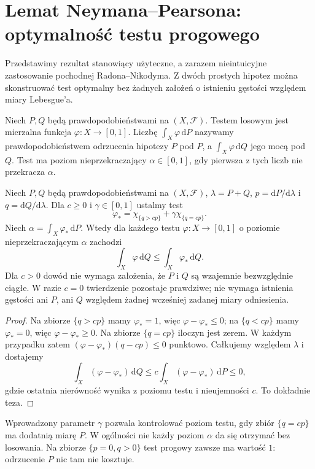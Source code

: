 \section{Lemat Neymana--Pearsona: optymalność testu progowego}
Przedstawimy rezultat stanowiący użyteczne, a zarazem nieintuicyjne
zastosowanie pochodnej Radona--Nikodyma. Z dwóch prostych hipotez
można skonstruować test optymalny bez żadnych założeń o istnieniu
gęstości względem miary Lebesgue'a.

\begin{definicja}
\label{def:test-19}
Niech $P,Q$ będą prawdopodobieństwami na $(X,\mathcal F)$.
Testem losowym jest mierzalna funkcja $\varphi:X\to[0,1]$.
Liczbę $\int_X\varphi\,\mathrm dP$ nazywamy
prawdopodobieństwem odrzucenia hipotezy $P$ pod $P$,
a $\int_X\varphi\,\mathrm dQ$ jego mocą pod $Q$.
Test ma poziom nieprzekraczający $\alpha\in[0,1]$,
gdy pierwsza z tych liczb nie przekracza $\alpha$.
\end{definicja}

\begin{twierdzenie}
\label{thm:neyman-pearson-19}
Niech $P,Q$ będą prawdopodobieństwami na $(X,\mathcal F)$,
$\lambda=P+Q$, $p=\mathrm dP/\mathrm d\lambda$
i $q=\mathrm dQ/\mathrm d\lambda$.
Dla $c\ge0$ i $\gamma\in[0,1]$ ustalmy test
\[
\varphi_*=\chi_{\{q>cp\}}+
 \gamma\chi_{\{q=cp\}}.
\]
Niech $\alpha=\int_X\varphi_*\,\mathrm dP$.
Wtedy dla każdego testu $\varphi:X\to[0,1]$ o poziomie
nieprzekraczającym $\alpha$ zachodzi
\[
 \int_X\varphi\,\mathrm dQ\le
 \int_X\varphi_*\,\mathrm dQ.
\]
Dla $c>0$ dowód nie wymaga założenia, że
$P$ i $Q$ są wzajemnie bezwzględnie ciągłe.
W razie $c=0$ twierdzenie pozostaje prawdziwe;
nie wymaga istnienia gęstości ani $P$, ani $Q$ względem
żadnej wcześniej zadanej miary odniesienia.
\end{twierdzenie}
\begin{proof}
Na zbiorze $\{q>cp\}$ mamy $\varphi_*=1$, więc
$\varphi-\varphi_*\le0$; na $\{q<cp\}$ mamy
$\varphi_*=0$, więc $\varphi-\varphi_*\ge0$.
Na zbiorze $\{q=cp\}$ iloczyn jest zerem. W każdym
przypadku zatem
$(\varphi-\varphi_*)(q-cp)\le0$ punktowo.
Całkujemy względem $\lambda$ i dostajemy
\[
\int_X(\varphi-\varphi_*)\,\mathrm dQ
\le c\int_X(\varphi-\varphi_*)\,\mathrm dP\le0,
\]
gdzie ostatnia nierówność wynika z poziomu testu
i nieujemności $c$. To dokładnie teza.
\end{proof}

\begin{uwaga}
Wprowadzony parametr $\gamma$ pozwala kontrolować poziom
testu, gdy zbiór $\{q=cp\}$ ma dodatnią miarę $P$.
W ogólności nie każdy poziom $\alpha$ da się otrzymać
bez losowania. Na zbiorze $\{p=0,q>0\}$ test progowy
zawsze ma wartość $1$: odrzucenie $P$ nic tam nie kosztuje.
\end{uwaga}

